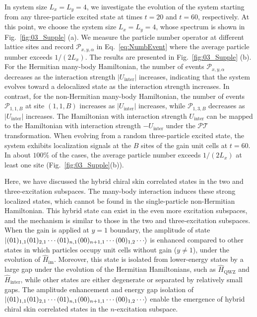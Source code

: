 \documentclass[longbibliography, aps, prx, amsmath, amssymb, amsfonts, twocolumn,superscriptaddress, footinbib]{revtex4-1}
\begin{document}
	In system size $L_x = L_y = 4$, we investigate the evolution of the system starting from any three-particle excited state at times $t = 20$ and $t = 60$, respectively. 
	At this point, we choose the system size $L_x=L_y=4$, whose spectrum is shown in Fig.~\ref{fig:03_Supple} (a). 
	We measure the particle number operator at different lattice sites and record $\mathcal{P}_{x,y,\alpha}$ in Eq.~\eqref{eq:NumbEvent} where the average particle number exceeds $1/(2L_x)$. The results are presented in Fig.~\ref{fig:03_Supple} (b).
	For the Hermitian many-body Hamiltonian, the number of events $\mathcal{P}_{x,y,\alpha}$ decreases as the interaction strength $\vert U_{\text{inter}}\vert $ increases, indicating that the system evolves toward a delocalized state as the interaction strength increases. 
	In contrast, for the non-Hermitian many-body Hamiltonian, the number of events $\mathcal{P}_{1,1,B}$ at site $(1,1,B)$ increases as $\vert U_{\text{inter}}\vert$ increases, while $\mathcal{P}_{1,3,B}$ decreases as $\vert U_{\text{inter}}\vert$ increases. 
	The Hamiltonian with interaction strength $U_{\text{inter}}$ can be mapped to the Hamiltonian with interaction strength $-U_{\text{inter}}$ under the $\mathcal{PT}$ transformation.
	When evolving from a random three-particle excited state, the system exhibits localization signals at the $B$ sites of the gain unit cells at $t=60$.
	In about $100\%$ of the cases, the average particle number exceeds $1/(2L_x)$ at least one site (Fig.~\ref{fig:03_Supple}(b)).

	Here, we have discussed the hybrid chiral skin correlated states in the two and three-excitation subspaces. The many-body interaction induces these strong localized states, which cannot be found in the single-particle non-Hermitian Hamiltonian. This hybrid state can exist in the even more excitation subspaces, and the mechanism is similar to those in the two and three-excitation subspaces. 
	When the gain is applied at $y=1$ boundary, the amplitude of state $\ket{(01)_{1,1}(01)_{2,1}\cdots(01)_{n,1}(00)_{n+1,1}\cdots(00)_{1,2}\cdots}$ is enhanced compared to other states in which particles occupy unit cells without gain ($y\neq 1$), under the evolution of $\hat{H}_{\text{im}}$. Moreover, this state is isolated from lower-energy states by a large gap under the evolution of the Hermitian Hamiltonians, such as $\hat{H}_{\text{QWZ}}$ and $\hat{H}_{\text{inter}}$, while other states are either degenerate or separated by relatively small gaps. The amplitude enhancement and energy gap isolation of $\ket{(01)_{1,1}(01)_{2,1}\cdots(01)_{n,1}(00)_{n+1,1}\cdots(00)_{1,2}\cdots}$ enable the emergence of hybrid chiral skin correlated states in the $n$-excitation subspace. 
\end{document}
